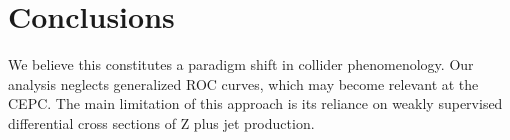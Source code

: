 \section{Conclusions}\label{sec:conclusions}

We believe this constitutes a paradigm shift in collider phenomenology.
Our analysis neglects generalized ROC curves, which may become relevant
at the CEPC. The main limitation of this approach is its reliance on
weakly supervised differential cross sections of Z plus jet production.

